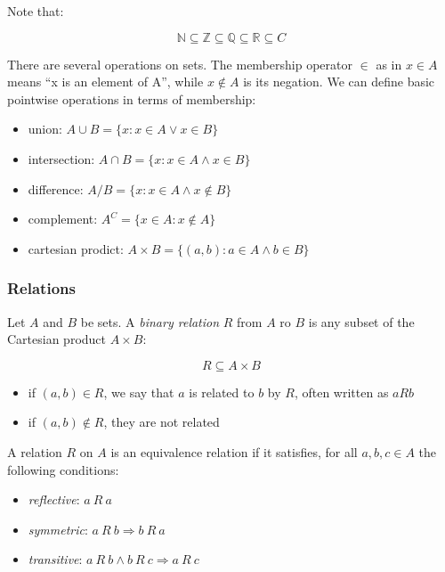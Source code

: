 \documentclass{article}
\begin{document}
Note that:

\[\mathbb{N} \subseteq \mathbb{Z} \subseteq \mathbb{Q} \subseteq \mathbb{R}
\subseteq{C}\]

There are several operations on sets. The membership operator \(\in\) as
in \(x \in
A\) means ``x is an element of A'', while \(x \notin A\) is its
negation. We can define basic pointwise operations in terms of
membership:

\begin{itemize}
\tightlist
\item
  union: \(A \cup B = \{ x: x\in A \lor x\in B \}\)
\item
  intersection: \(A \cap B = \{ x: x\in A \land x\in B \}\)
\item
  difference: \(A \slash B = \{ x: x\in A \land x\notin B \}\)
\item
  complement: \(A^C = \{x\in A: x\notin A \}\)
\item
  cartesian prodict: \(A \times B = \{(a, b): a\in A \land b\in B\}\)
\end{itemize}

\subsubsection{Relations}\label{relations}

Let \(A\) and \(B\) be sets. A \emph{binary relation} \(R\) from \(A\)
ro \(B\) is any subset of the Cartesian product \(A \times B\):

\[R \subseteq A \times B\]

\begin{itemize}
\tightlist
\item
  if \((a, b)\in R\), we say that \(a\) is related to \(b\) by \(R\),
  often written as \(aRb\)
\item
  if \((a, b)\notin R\), they are not related
\end{itemize}

A relation \(R\) on \(A\) is an equivalence relation if it satisfies,
for all \(a, b,
c\in A\) the following conditions:

\begin{itemize}
\tightlist
\item
  \emph{reflective}: \(a\ R\ a\)
\item
  \emph{symmetric}: \(a\ R\ b \Rightarrow b\ R\ a\)
\item
  \emph{transitive}: \(a\ R\ b \land b\ R\ c \Rightarrow a\ R\ c\)
\end{itemize}
\end{document}
